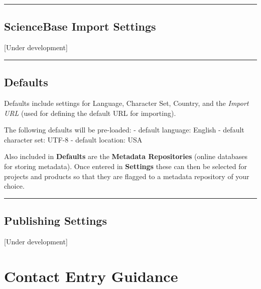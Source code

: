 \documentclass[
]{book}
\begin{document}
\begin{center}\rule{0.5\linewidth}{\linethickness}\end{center}

\hypertarget{sciencebase-import-settings}{%
\section*{ScienceBase Import Settings}\label{sciencebase-import-settings}}

{[}Under development{]}

\begin{center}\rule{0.5\linewidth}{\linethickness}\end{center}

\hypertarget{defaults}{%
\section*{Defaults}\label{defaults}}

Defaults include settings for Language, Character Set, Country, and the \emph{Import URL }(used for defining the default URL for importing).

The following defaults will be pre-loaded:
- default language: English
- default character set: UTF-8
- default location: USA

Also included in \textbf{Defaults} are the \textbf{Metadata Repositories} (online databases for storing metadata). Once entered in \textbf{Settings} these can then be selected for projects and products so that they are flagged to a metadata repository of your choice.

\begin{center}\rule{0.5\linewidth}{\linethickness}\end{center}

\hypertarget{publishing-settings}{%
\section*{Publishing Settings}\label{publishing-settings}}

{[}Under development{]}

\hypertarget{contact-entry-guidance}{%
\chapter*{Contact Entry Guidance}\label{contact-entry-guidance}}
\end{document}
